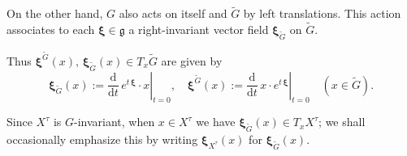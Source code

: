 \documentclass[12pt,a4paper]{article}
\theoremstyle{plain}
\theoremstyle{definition}
\begin{document}
On the other hand, $G$ also acts on itself and $\tilde{G}$ by left translations. This action associates to each $\boldsymbol{\xi}\in 
\mathfrak{g}$ a right-invariant vector field $\boldsymbol{\xi}_{\tilde{G}}$
on $\tilde{G}$. 

Thus $\boldsymbol{\xi
}^{\tilde{G}}(x),\,\boldsymbol{\xi
}_{\tilde{G}}(x)\in T_x\tilde{G}$ are given by
$$
\boldsymbol{\xi
}_{\tilde{G}}(x):=\left.\frac{\mathrm{d}}{\mathrm{d}t}\,
e^{t\,\boldsymbol{\xi}}
\cdot x\right|_{t=0},\quad
\boldsymbol{\xi
}^{\tilde{G}}(x):=\left.\frac{\mathrm{d}}{\mathrm{d}t}\,
x\cdot e^{t\,\boldsymbol{\xi}}\right|_{t=0}\quad
(x\in \tilde{G}).
$$

Since $X^\tau$ is $G$-invariant,
when $x\in X^\tau$ we have $\boldsymbol{\xi
}_{\tilde{G}}(x)\in T_xX^\tau$; we shall occasionally emphasize this by writing $\boldsymbol{\xi
}_{X^\tau}(x)$ for $\boldsymbol{\xi
}_{\tilde{G}}(x)$.
\end{document}
